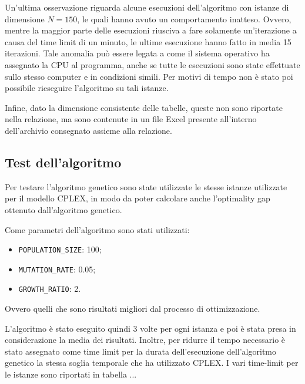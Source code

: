 Un'ultima osservazione riguarda alcune esecuzioni dell'algoritmo con istanze di dimensione $N=150$, le quali hanno avuto un comportamento inatteso. 
Ovvero, mentre la maggior parte delle esecuzioni riusciva a fare solamente un'iterazione a causa del time limit di un minuto, le ultime esecuzione hanno fatto in media 15 iterazioni. Tale anomalia può essere legata a come il sistema operativo ha assegnato la CPU al programma, anche se tutte le esecuzioni sono state effettuate sullo stesso computer e in condizioni simili. Per motivi di tempo non è stato poi possibile rieseguire l'algoritmo su tali istanze.

Infine, dato la dimensione consistente delle tabelle, queste non sono riportate nella relazione, ma sono contenute in un file Excel presente all'interno dell'archivio consegnato assieme alla relazione.

\subsection{Test dell'algoritmo}

Per testare l'algoritmo genetico sono state utilizzate le stesse istanze utilizzate per il modello CPLEX, in modo da poter calcolare anche l'optimality gap ottenuto dall'algoritmo genetico.

Come parametri dell'algoritmo sono stati utilizzati:

\begin{itemize}
	\item \texttt{POPULATION\_SIZE}: 100;
	\item \texttt{MUTATION\_RATE}: 0.05;
	\item \texttt{GROWTH\_RATIO}: 2.
\end{itemize}

\noindent Ovvero quelli che sono risultati migliori dal processo di ottimizzazione.

L'algoritmo è stato eseguito quindi 3 volte per ogni istanza e poi è stata presa in considerazione la media dei risultati. 
Inoltre, per ridurre il tempo necessario è stato assegnato come time limit per la durata dell'esecuzione dell'algoritmo genetico la stessa soglia temporale che ha utilizzato CPLEX.
I vari time-limit per le istanze sono riportati in tabella ...




